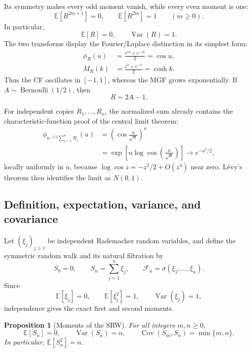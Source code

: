 \documentclass[10pt,a4paper]{article}
\numberwithin{equation}{section}
\theoremstyle{blueplain}
\newtheorem{proposition}[theorem]{Proposition}
\theoremstyle{definition}
\newcommand{\E}{\mathbb E}
\newcommand{\F}{\mathcal F}
\newcommand{\Var}{\operatorname{Var}}
\newcommand{\Cov}{\operatorname{Cov}}
\begin{document}
Its symmetry makes every odd moment vanish, while every even moment is one:
\[
  \E[R^{2m+1}]=0,
  \qquad
  \E[R^{2m}]=1
  \qquad(m\ge0).
\]
In particular,
\[
  \E[R]=0,
  \qquad
  \Var(R)=1.
\]
The two transforms display the Fourier/Laplace distinction in its simplest
form:
\begin{align}
  \phi_R(u)
  &=\frac{e^{iu}+e^{-iu}}2=\cos u,
  \label{eq:rademacher-cf}\\
  M_R(k)
  &=\frac{e^k+e^{-k}}2=\cosh k.
  \label{eq:rademacher-mgf}
\end{align}
Thus the CF oscillates in \([-1,1]\), whereas the MGF grows exponentially.
If \(A\sim\operatorname{Bernoulli}(1/2)\), then
\begin{equation}
  R=2A-1.
  \label{eq:rademacher-bernoulli}
\end{equation}

For independent copies \(R_1,\ldots,R_n\), the normalized sum already contains
the characteristic-function proof of the central limit theorem:
\begin{align}
  \phi_{n^{-1/2}\sum_{j=1}^nR_j}(u)
  &=\left(\cos\frac{u}{\sqrt n}\right)^n\\
  &=\exp\!\left[
    n\log\cos\!\left(\frac{u}{\sqrt n}\right)
  \right]
  \longrightarrow e^{-u^2/2},
  \label{eq:rademacher-clt-cf}
\end{align}
locally uniformly in \(u\), because
\(\log\cos z=-z^2/2+O(z^4)\) near zero.  L\'evy's theorem then identifies the
limit as \(N(0,1)\).

\subsection{Definition, expectation, variance, and covariance}

Let \((\xi_j)_{j\ge1}\) be independent Rademacher random variables,
and define the symmetric random walk and its natural filtration by
\begin{equation}
  S_0=0,
  \qquad
  S_n=\sum_{j=1}^n\xi_j,
  \qquad
  \F_n=\sigma(\xi_1,\ldots,\xi_n).
  \label{eq:srw-definition}
\end{equation}
Since
\[
  \E[\xi_j]=0,
  \qquad
  \E[\xi_j^2]=1,
  \qquad
  \Var(\xi_j)=1,
\]
independence gives the exact first and second moments.

\begin{proposition}[Moments of the SRW]
For all integers \(m,n\ge0\),
\begin{equation}
  \E[S_n]=0,
  \qquad
  \Var(S_n)=n,
  \qquad
  \Cov(S_m,S_n)=\min\{m,n\}.
  \label{eq:srw-moments}
\end{equation}
In particular, \(\E[S_n^2]=n\).
\end{proposition}
\end{document}

